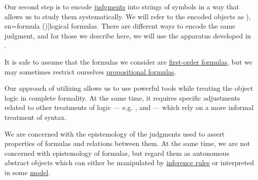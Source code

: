 \begin{definition}\label{def:logical_formula}\mimprovised
  Our second step is to encode \hyperref[def:judgment]{judgments} into strings of symbols in a way that allows us to study them systematically. We will refer to the encoded objects as \term[ru=формула (\cite[def. 1.1.3]{Герасимов2011}), en=formula (\cite[18]{Kleene2002Logic})]{logical formulas}. There are different ways to encode the same judgment, and for those we describe here, we will use the apparatus developed in .

  It is safe to assume that the formulas we consider are \hyperref[def:first_order_syntax/formula]{first-order formulas}, but we may sometimes restrict ourselves \hyperref[def:propositional_formula]{propositional formulas}.
\end{definition}
\begin{comments}
  \item Our approach of utilizing  allows us to use powerful tools while treating the object logic in complete formality. At the same time, it requires specific adjustments related to other treatments of logic --- e.g. ,  and  --- which rely on a more informal treatment of syntax.

  \item We are concerned with the epistemology of the judgments used to assert properties of formulas and relations between them. At the same time, we are not concerned with epistemology of formulas, but regard them as autonomous abstract objects which can either be manipulated by \hyperref[def:inference_rule]{inference rules} or interpreted in some \hyperref[def:logical_model]{model}.
\end{comments}


